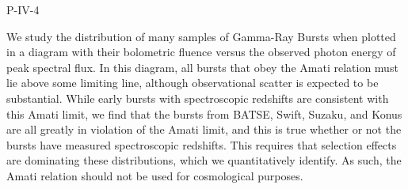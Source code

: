 P-IV-4


\bigskip



\bigskip

\noindent We study the distribution of many samples of Gamma-Ray Bursts when plotted in a diagram with their bolometric fluence versus the observed photon energy of peak spectral flux.  In this diagram, all bursts that obey the Amati relation must lie above some limiting line, although observational scatter is expected to be substantial.  While early bursts with spectroscopic redshifts are consistent with this Amati limit, we find that the bursts from BATSE, Swift, Suzaku, and Konus are all greatly in violation of the Amati limit, and this is true whether or not the bursts have measured spectroscopic redshifts.  This requires that selection effects are dominating these distributions, which we quantitatively identify.  As such, the Amati relation should not be used for cosmological purposes.

